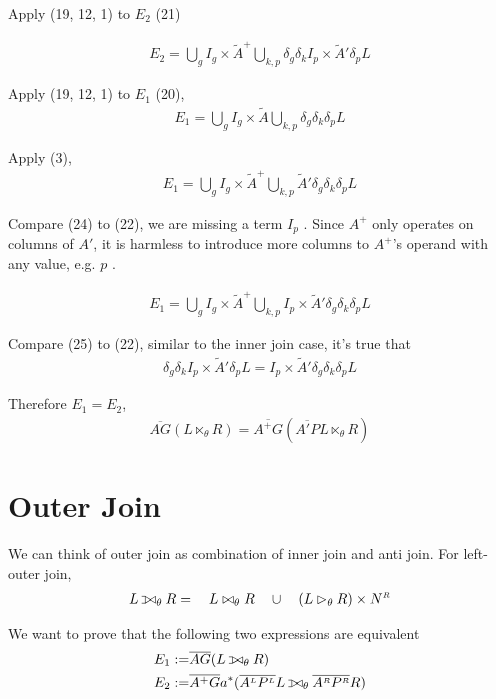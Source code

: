 \documentclass[article]{article}
\newcommand{\U}{\bigcup}
\newcommand{\ag}[1]{\overline{#1}}
\newcommand{\LL}{^\mathsmaller{\mathsmaller L}}
\newcommand{\RR}{^\mathsmaller{\mathsmaller R}}
\newcommand{\EA}{\tilde{A}}
\def\ojoin{\setbox0=\hbox{$\bowtie$} \rule[-.02ex]{.25em}{.4pt}\llap{\rule[\ht0]{.25em}{.4pt}}}
\def\loj{\mathbin{\ojoin\mkern-5.8mu\bowtie}}
\begin{document}
Apply (19, 12, 1) to $E_2$ (21)

\begin{align}
E_2 = \U_g I_g \times \EA^+ \U_{k,p}
\delta_g \delta_k I_p \times \EA' \delta_p L
\end{align}

Apply (19, 12, 1) to $E_1$ (20),
\begin{align}
E_1 = \U_g I_g \times \EA \U_{k,p} \delta_g \delta_k \delta_p L
\end{align}

Apply (3), 
\begin{align}
E_1 = \U_g I_g \times \EA^+ \U_{k,p} \EA' \delta_g \delta_k \delta_p L
\end{align}

Compare (24) to (22), we are missing a term $I_{p}$ . 
Since $A^+$ only operates on columns of $A'$,
it is harmless to introduce more columns to $A^+$'s operand with any value, e.g. ${p}$ .

\begin{align}
E_1 = \U_g I_g \times \EA^+ \U_{k,p} I_p \times \EA' \delta_g \delta_k \delta_p L
\end{align}

Compare (25) to (22), similar to the inner join case, it's true that
\begin{align}
  \delta_{g} \delta_{k}  I_{p} \times \EA'  \delta_{p} L
 =  I_{p} \times \EA'  \delta_{g} \delta_{k} \delta_{p} L
\end{align}

Therefore $E_1 = E_2$, 
\begin{align}
\ag{A G} (L \ltimes_\theta R)  
= \ag{A^+ G} (\ag{ A' P} L \ltimes_\theta R)
\end{align}

\section{ Outer Join }

We can think of outer join as combination of inner join and anti join.
For left-outer join,
\begin{align}
L \loj_\theta R = \quad L \bowtie_\theta R \quad\cup\quad  (L \rhd_\theta R) \times N\RR
\end{align}

We want to prove that the following two expressions are equivalent
\begin{align}
E_1 :=& \ag{AG} (L \loj_\theta R)  \\
E_2 :=& \ag{A^+ G} a^* (\ag{A\LL P\LL} L \loj_\theta \ag{A\RR P\RR} R) 
\end{align}
\end{document}
